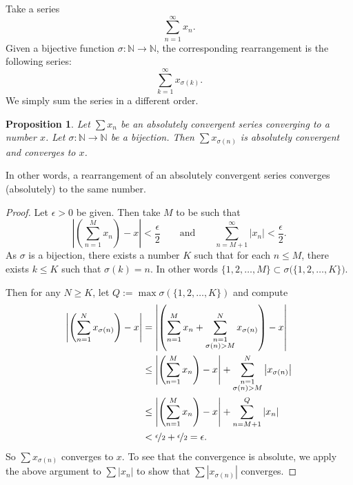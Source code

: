 \documentclass[12pt]{book}
\newcommand{\abs}[1]{\left\lvert {#1} \right\rvert}
\newcommand{\N}{{\mathbb{N}}}
\theoremstyle{plain}
\newtheorem{prop}[thm]{Proposition}
\theoremstyle{remark}
\theoremstyle{definition}
\theoremstyle{exercise}
\theoremstyle{example}
\begin{document}
Take a series
\begin{equation*}
\sum_{n=1}^\infty x_n .
\end{equation*}
Given a bijective function $\sigma \colon \N \to \N$, the corresponding
rearrangement is the following
series:
\begin{equation*}
\sum_{k=1}^\infty x_{\sigma(k)} .
\end{equation*}
We simply sum the series in a different order.

\begin{prop}
Let $\sum x_n$ be an absolutely convergent series converging to a number
$x$.  Let $\sigma \colon \N \to \N$ be a bijection.  Then
$\sum x_{\sigma(n)}$ is absolutely convergent and converges to $x$.
\end{prop}

In other words,
a rearrangement of an absolutely convergent series converges (absolutely)
to the same number.

\begin{proof}
Let $\epsilon > 0$ be given.  Then take $M$ to be such that
\begin{equation*}
\abs{\left(\sum_{n=1}^M x_n \right) - x} < \frac{\epsilon}{2}
\qquad \text{and} \qquad
\sum_{n=M+1}^\infty \abs{x_n} < \frac{\epsilon}{2} .
\end{equation*}
As $\sigma$ is a bijection,
there exists a number $K$ such that for each
$n \leq M$, there exists $k \leq K$ such that $\sigma(k) = n$.
In other words
$\{ 1,2,\ldots,M \} \subset \sigma\bigl(\{ 1,2,\ldots,K \} \bigr)$.

Then for any $N \geq K$, let $Q := \max \sigma(\{ 1,2,\ldots,K \})$
and compute
\begin{equation*}
\begin{split}
\abs{\left( \sum_{n=1}^N x_{\sigma(n)} \right) - x}
& =
\abs{ \left( \sum_{n=1}^M x_n
+
\sum_{\substack{n=1\\\sigma(n) > M}}^N x_{\sigma(n)} \right) - x}
\\
& \leq
\abs{ \left( \sum_{n=1}^M x_n \right) - x}
+
\sum_{\substack{n=1\\\sigma(n) > M}}^N \abs{x_{\sigma(n)}}
\\
& \leq
\abs{ \left( \sum_{n=1}^M x_n \right) - x}
+
\sum_{n=M+1}^Q \abs{x_{n}}
\\
& < \nicefrac{\epsilon}{2} + \nicefrac{\epsilon}{2} = \epsilon .
\end{split}
\end{equation*}
So 
$\sum x_{\sigma(n)}$ converges to $x$.  To see that the convergence
is absolute, we apply the above argument to $\sum \abs{x_n}$ to show
that $\sum \abs{x_{\sigma(n)}}$ converges.
\end{proof}
\end{document}
